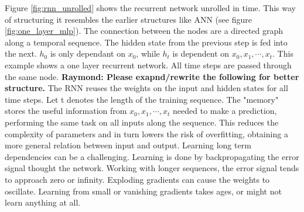 
Figure \ref{fig:rnn_unrolled} shows the recurrent network unrolled in time. This way of structuring it resembles the earlier structures like ANN (see figure \ref{fig:one_layer_mlp}). The connection between the nodes %
are a directed graph along a temporal sequence. The hidden state from the previous step is fed into the next. $h_0$ is only dependant on $x_0$, while $h_t$ is dependent on $x_0, x_1, \cdots, x_t $. This example shows a one layer recurrent network. All time steps are passed through the same node. \textbf{Raymond: Please exapnd/rewrite the following for better structure.} The RNN reuses the weights on the input and hidden states for all time steps. Let t denotes the length of the training sequence. The "memory" stores the useful information from $x_0, x_1, \cdots, x_t $ needed to make a prediction, performing the same task on all inputs along the sequence. This reduces the complexity of parameters and in turn lowers the risk of overfitting, obtaining a more general relation between input and output.
Learning long term dependencies can be a challenging. Learning is done by backpropagating the error signal thought the network. Working with longer sequences, the error signal tends to approach zero or infinity. Exploding gradients can cause the weights to oscillate. Learning from small or vanishing gradients takes ages, or might not learn anything at all. 

